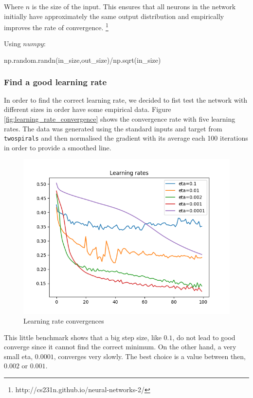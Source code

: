 \documentclass[11pt]{article}
\begin{document}
Where $n$ is the size of the input. This ensures that all neurons in the network initially have approximately the same output distribution and empirically improves the rate of convergence. \footnote{http://cs231n.github.io/neural-networks-2/}

Using $numpy$:
\begin{python}
np.random.randn(in_size,out_size)/np.sqrt(in_size)
\end{python}

\subsubsection{Find a good learning rate}
In order to find the correct learning rate, we decided to fist test the network with different sizes in order have some empirical data. Figure \ref{fig:learning_rate_convergence} shows the convergence rate with five learning rates. The data was generated using the standard inputs and target from \texttt{twospirals} and then normalised the gradient with its average each 100 iterations in order to provide a smoothed line.

\begin{figure}[H]
\centering
\label{fig: learning_rate_convergence}
\includegraphics[scale=0.5]{images/NN_eta_vs_training}
\caption{Learning rate convergences}
\end{figure}

This little benchmark shows that a big step size, like $0.1$, do not lead to good converge since it cannot find the correct minimum. On the other hand, a very small eta, $0.0001$, converges very slowly. The best choice is a value between then, $0.002$ or $0.001$.
\end{document}
